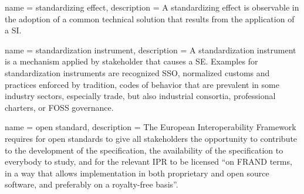  { name = {standardizing effect}, description = {
    A standardizing effect is observable in the adoption of a common
    technical solution that results from the application of a
    \gls{SI}.} }

 { name = {standardization instrument},
  description = { A standardization instrument is a mechanism applied
    by stakeholder that causes a \gls{SE}. Examples for
    standardization instruments are recognized \gls{SSO}, normalized
    customs and practices enforced by tradition, codes of behavior
    that are prevalent in some industry sectors, especially trade, but
    also industrial consortia, professional charters, or \gls{FOSS}
    governance.} }

 { name = {open standard}, description = {
    The European Interoperability Framework requires for open
    standards to give all stakeholders the opportunity to contribute
    to the development of the specification, the availability of the
    specification to everybody to study, and for the relevant
    \gls{IPR} to be licensed ``on \gls{FRAND} terms, in a way that
    allows implementation in both proprietary and open source
    software, and preferably on a royalty-free
    basis''.\cite{citeulike:14532877} } }
